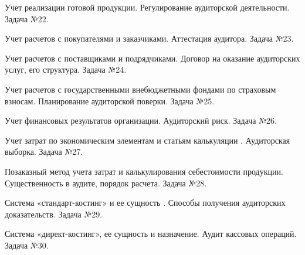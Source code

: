 \documentclass[
	11pt,
	a4paper,
	]
	{article}
\begin{document}
\noindent{} 
	{
		Учет реализации готовой продукции.
	}{
		Регулирование аудиторской деятельности.
	}{
		Задача №22.
	}

\bigskip

\noindent{} 
	{
		Учет расчетов с покупателями и заказчиками.
	}{
		Аттестация аудитора.
	}{
		Задача №23.
	}

\bigskip

\noindent{} 
	{
		Учет расчетов с поставщиками и подрядчиками.
	}{
		Договор на оказание аудиторских услуг, его структура.
	}{
		Задача №24.
	}

\bigskip

\noindent{} 
	{
		Учет расчетов с государственными внебюджетными фондами по страховым взносам.
	}{
		Планирование аудиторской поверки.
	}{
		Задача №25.
	}

\bigskip

\noindent{} 
	{
		Учет финансовых результатов организации.
	}{
		Аудиторский риск.
	}{
		Задача №26.
	}

\bigskip

\noindent{} 
	{
		Учет затрат по экономическим элементам и статьям калькуляции .
	}{
		Аудиторская выборка.
	}{
		Задача №27.
	}

\bigskip

\noindent{} 
	{
		Позаказный метод учета затрат и калькулирования себестоимости продукции.
	}{
		Существенность в аудите, порядок расчета.
	}{
		Задача №28.
	}

\bigskip

\noindent{} 
	{
		Система «стандарт-костинг» и ее сущность .
	}{
		Способы получения аудиторских доказательств.
	}{
		Задача №29.
	}

\bigskip

\noindent{} 
	{
		Система «директ-костинг», ее сущность и назначение.
	}{
		Аудит кассовых операций.
	}{
		Задача №30.
	}

\bigskip
\end{document}
